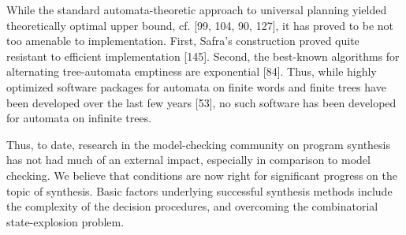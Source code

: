 




While the standard automata-theoretic approach to universal planning yielded theoretically optimal upper bound, cf. [99, 104, 90, 127], it has proved to be not too amenable to implementation. First, Safra’s construction proved quite resistant to efficient implementation [145]. Second, the best-known algorithms for alternating tree-automata emptiness are exponential [84]. Thus, while highly optimized software packages for automata on finite words and finite trees have been developed over the last few years [53], no such software has been developed for automata on infinite trees.

Thus, to date, research in the model-checking community on program synthesis has not had much of an external impact, especially in comparison to model checking. We believe that conditions are now right for significant progress on the topic of synthesis. Basic factors underlying successful synthesis methods include the complexity of the decision procedures, and overcoming the combinatorial state-explosion problem. 



